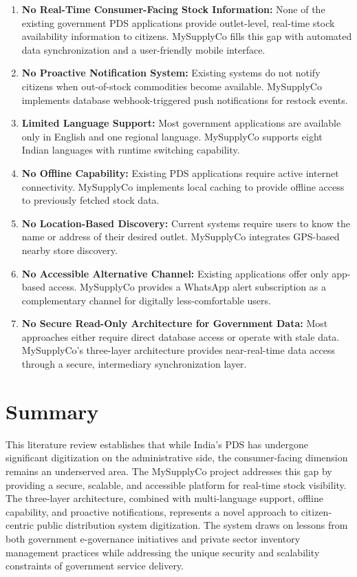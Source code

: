 \begin{enumerate}[label=\arabic*.]
    \item \textbf{No Real-Time Consumer-Facing Stock Information:} None of the existing government PDS applications provide outlet-level, real-time stock availability information to citizens. MySupplyCo fills this gap with automated data synchronization and a user-friendly mobile interface.

    \item \textbf{No Proactive Notification System:} Existing systems do not notify citizens when out-of-stock commodities become available. MySupplyCo implements database webhook-triggered push notifications for restock events.

    \item \textbf{Limited Language Support:} Most government applications are available only in English and one regional language. MySupplyCo supports eight Indian languages with runtime switching capability.

    \item \textbf{No Offline Capability:} Existing PDS applications require active internet connectivity. MySupplyCo implements local caching to provide offline access to previously fetched stock data.

    \item \textbf{No Location-Based Discovery:} Current systems require users to know the name or address of their desired outlet. MySupplyCo integrates GPS-based nearby store discovery.

    \item \textbf{No Accessible Alternative Channel:} Existing applications offer only app-based access. MySupplyCo provides a WhatsApp alert subscription as a complementary channel for digitally less-comfortable users.

    \item \textbf{No Secure Read-Only Architecture for Government Data:} Most approaches either require direct database access or operate with stale data. MySupplyCo's three-layer architecture provides near-real-time data access through a secure, intermediary synchronization layer.
\end{enumerate}

\section{Summary}

This literature review establishes that while India's PDS has undergone significant digitization on the administrative side, the consumer-facing dimension remains an underserved area. The MySupplyCo project addresses this gap by providing a secure, scalable, and accessible platform for real-time stock visibility. The three-layer architecture, combined with multi-language support, offline capability, and proactive notifications, represents a novel approach to citizen-centric public distribution system digitization. The system draws on lessons from both government e-governance initiatives and private sector inventory management practices while addressing the unique security and scalability constraints of government service delivery.
